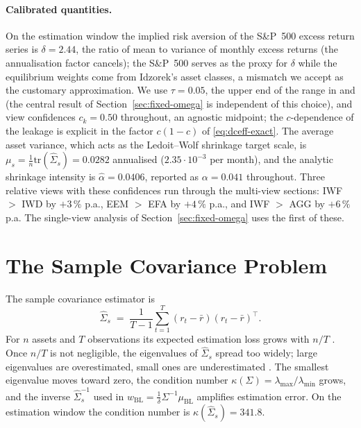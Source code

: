 \documentclass[a4paper,11pt]{article}
\theoremstyle{plain}
\theoremstyle{definition}
\newcommand{\muBL}{\mu_{\mathrm{BL}}}
\begin{document}
\paragraph{Calibrated quantities.}
On the estimation window the implied risk aversion of the S\&P~500 excess
return series is $\delta = 2.44$, the ratio of mean to variance of
monthly excess returns (the annualisation factor cancels); the
S\&P~500 serves as the proxy for $\delta$ while the equilibrium weights
come from Idzorek's asset classes, a mismatch we accept as the
customary approximation. We use $\tau = 0.05$, the upper end of the range in
\citet{HeLitterman1999} and \citet{Idzorek2007} (the central result of
Section~\ref{sec:fixed-omega} is independent of this choice), and view
confidences $c_k = 0.50$ throughout, an agnostic midpoint; the
$c$-dependence of the leakage is explicit in the factor $c(1-c)$ of
\eqref{eq:dceff-exact}. The average asset variance, which
acts as the Ledoit--Wolf shrinkage target scale, is
$\mu_s = \tfrac{1}{n}\mathrm{tr}(\hat\Sigma_s) = 0.0282$ annualised
($2.35\cdot 10^{-3}$ per month), and the analytic shrinkage intensity is
$\hat\alpha = 0.0406$, reported as $\alpha = 0.041$ throughout. Three
relative views with these confidences run through
the multi-view sections: IWF $>$ IWD by $+3\,\%$ p.a., EEM $>$ EFA by
$+4\,\%$ p.a., and IWF $>$ AGG by $+6\,\%$ p.a. The single-view analysis
of Section~\ref{sec:fixed-omega} uses the first of these.

\section{The Sample Covariance Problem}
\label{sec:sample-problem}

The sample covariance estimator is
\[
  \hat\Sigma_s \;=\; \frac{1}{T-1}\sum_{t=1}^T (r_t - \bar r)(r_t - \bar r)^\top.
\]
For $n$ assets and $T$ observations its expected estimation loss grows
with $n/T$ \citep{LedoitWolf2004}. Once $n/T$ is not
negligible, the eigenvalues of $\hat\Sigma_s$ spread
too widely; large eigenvalues are overestimated, small ones are
underestimated \citep[p.~371]{LedoitWolf2004}. The smallest eigenvalue
moves toward zero, the condition number
$\kappa(\Sigma) = \lambda_{\max}/\lambda_{\min}$ grows, and the inverse
$\hat\Sigma_s^{-1}$ used in
$w_{\mathrm{BL}} = \tfrac{1}{\delta}\Sigma^{-1}\muBL$ amplifies
estimation error. On the estimation window the condition number is
$\kappa(\hat\Sigma_s) = 341.8$.
\end{document}
